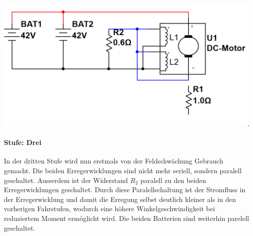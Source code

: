 \begin{minipage}{0.49\textwidth}
	\includegraphics[width=\columnwidth]{images/Stufenschalter/Stufe_3.png}%
\end{minipage}
\begin{minipage}{0.5\textwidth}
	\paragraph{Stufe: Drei}
	In der dritten Stufe wird nun erstmals von der Feldschwächung Gebrauch gemacht. Die beiden Erregerwicklungen sind nicht mehr seriell, sondern paralell geschaltet. Ausserdem ist der Widerstand $R_2$ paralell zu den beiden Erregerwicklungen geschaltet. Durch diese Paralellschaltung ist der Stromfluss in der Erregerwicklung und damit die Erregung selbst deutlich kleiner als in den vorherigen Fahrstufen, wodurch eine höhere Winkelgeschwindigkeit bei reduziertem Moment ermöglicht wird. Die beiden Batterien sind weiterhin parelell geschaltet.
\end{minipage}

